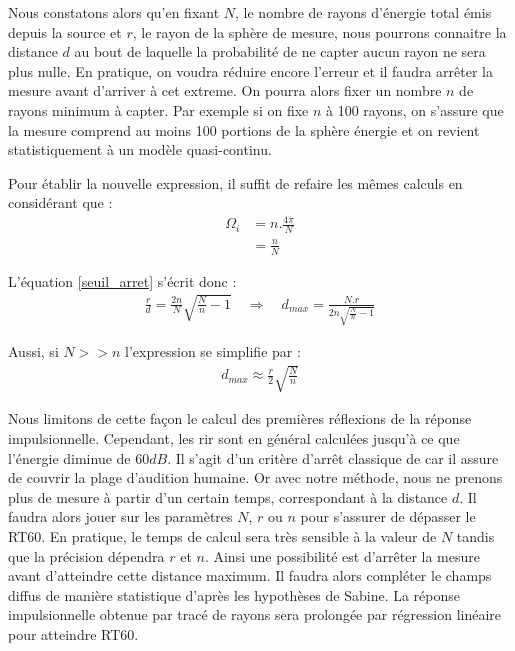 Nous constatons alors qu'en fixant $N$, le nombre de rayons d'énergie total émis depuis la source et $r$, le rayon de la sphère de mesure, nous pourrons connaitre la distance $d$ au bout de laquelle la probabilité de ne capter aucun rayon ne sera plus nulle. En pratique, on voudra réduire encore l'erreur et il faudra arrêter la mesure avant d'arriver à cet extreme. On pourra alors fixer un nombre $n$ de rayons minimum à capter. Par exemple si on fixe $n$ à 100 rayons, on s'assure que la mesure comprend au moins 100 portions de la sphère énergie et on revient statistiquement à un modèle quasi-continu.

Pour établir la nouvelle expression, il suffit de refaire les mêmes calculs en considérant que :
\begin{align}
	\Omega_i &= n.\frac{4\pi}{N} \\
	&= \frac{n}{N}
\end{align}

L'équation \ref{seuil_arret} s'écrit donc :
\begin{align} 
	\frac{r}{d} =  \frac{2n}{N} \sqrt{\frac{N}{n}-1} %
 	\quad \Rightarrow  \quad %
	 d_{max} =  \frac{N.r}{2n\sqrt{\frac{N}{n}-1}} 
\end{align}

Aussi, si $N >> n$ l'expression se simplifie par : 
\begin{align} \label{eq_dmax}
	 d_{max} \approx  \frac{r}{2} \sqrt{\frac{N}{n}}
\end{align}

Nous limitons de cette façon le calcul des premières réflexions de la réponse impulsionnelle. Cependant, les \gls{rir} sont en général calculées jusqu'à ce que l'énergie diminue de $60dB$. Il s'agit d'un critère d'arrêt classique de car il assure de couvrir la plage d'audition humaine. Or avec notre méthode, nous ne prenons plus de mesure à partir d'un certain temps, correspondant à la distance $d$. Il faudra alors jouer sur les paramètres $N$, $r$ ou $n$ pour s'assurer de dépasser le \gls{RT60}. En pratique, le temps de calcul sera très sensible à la valeur de $N$ tandis que la précision dépendra $r$ et $n$. Ainsi une possibilité est d'arrêter la mesure avant d'atteindre cette distance maximum. Il faudra alors compléter le champs diffus de manière statistique d'après les hypothèses de Sabine. La réponse impulsionnelle obtenue par tracé de rayons sera prolongée par régression linéaire pour atteindre \gls{RT60}. \\





